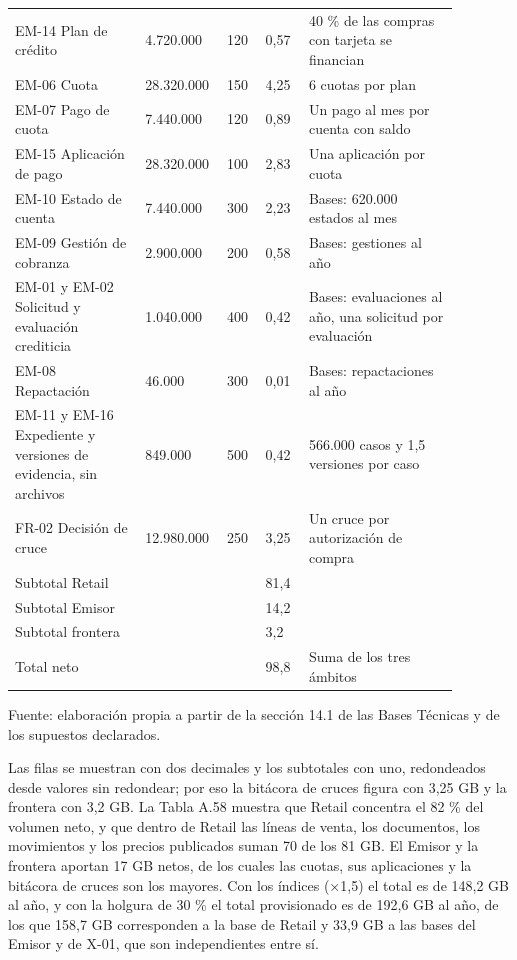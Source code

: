 \documentclass[11pt]{article}
\begin{document}
\begin{longtable}{@{}p{0.275\linewidth}p{0.109\linewidth}p{0.085\linewidth}p{0.095\linewidth}p{0.313\linewidth}@{}}
EM-14 Plan de crédito & 4.720.000 & 120 & 0,57 & 40 \% de las compras con tarjeta se financian \\
EM-06 Cuota & 28.320.000 & 150 & 4,25 & 6 cuotas por plan \\
EM-07 Pago de cuota & 7.440.000 & 120 & 0,89 & Un pago al mes por cuenta con saldo \\
EM-15 Aplicación de pago & 28.320.000 & 100 & 2,83 & Una aplicación por cuota \\
EM-10 Estado de cuenta & 7.440.000 & 300 & 2,23 & Bases: 620.000 estados al mes \\
EM-09 Gestión de cobranza & 2.900.000 & 200 & 0,58 & Bases: gestiones al año \\
EM-01 y EM-02 Solicitud y evaluación crediticia & 1.040.000 & 400 & 0,42 & Bases: evaluaciones al año, una solicitud por evaluación \\
EM-08 Repactación & 46.000 & 300 & 0,01 & Bases: repactaciones al año \\
EM-11 y EM-16 Expediente y versiones de evidencia, sin archivos & 849.000 & 500 & 0,42 & 566.000 casos y 1,5 versiones por caso \\
FR-02 Decisión de cruce & 12.980.000 & 250 & 3,25 & Un cruce por autorización de compra \\
Subtotal Retail &  &  & 81,4 &  \\
Subtotal Emisor &  &  & 14,2 &  \\
Subtotal frontera &  &  & 3,2 &  \\
Total neto &  &  & 98,8 & Suma de los tres ámbitos \\
\end{longtable}

{\raggedright Fuente: elaboración propia a partir de la sección 14.1 de las Bases Técnicas y de los supuestos declarados.\par}


Las filas se muestran con dos decimales y los subtotales con uno, redondeados desde valores sin redondear; por eso la bitácora de cruces figura con 3,25 GB y la frontera con 3,2 GB. La Tabla A.58 muestra que Retail concentra el 82 \% del volumen neto, y que dentro de Retail las líneas de venta, los documentos, los movimientos y los precios publicados suman 70 de los 81 GB. El Emisor y la frontera aportan 17 GB netos, de los cuales las cuotas, sus aplicaciones y la bitácora de cruces son los mayores. Con los índices (×1,5) el total es de 148,2 GB al año, y con la holgura de 30 \% el total provisionado es de 192,6 GB al año, de los que 158,7 GB corresponden a la base de Retail y 33,9 GB a las bases del Emisor y de X-01, que son independientes entre sí.
\end{document}
